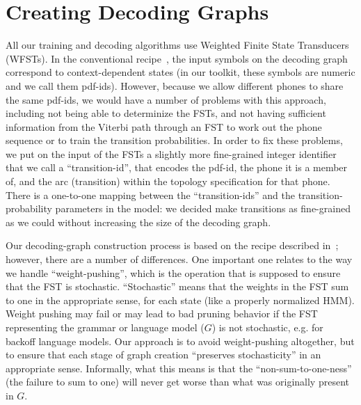 \documentclass[10pt,conference,letterpaper]{IEEEtran}
\begin{document}
\section{Creating Decoding Graphs}
\label{sec:graphs}

All our training and decoding algorithms use Weighted Finite State Transducers 
(WFSTs).  In the conventional 
recipe~\cite{wfst}, the input symbols on the decoding graph correspond to 
context-dependent states (in our toolkit, these symbols are 
numeric and we call them pdf-ids).  However, because we allow different phones 
to share the same pdf-ids, we would have a number of problems with this 
approach, including not being able to determinize the FSTs, and not having 
sufficient information from the Viterbi path through an FST to work out the 
phone sequence or to train the transition probabilities.  In order to fix these 
problems, we put on the input of the FSTs a slightly more fine-grained integer 
identifier that we call a ``transition-id'', that encodes the pdf-id, the phone 
it is a member of, and the arc (transition) within the topology specification 
for that phone.  There is a one-to-one mapping between the ``transition-ids'' 
and the transition-probability parameters in the model: we decided 
make transitions as fine-grained as we could without increasing the 
size of the decoding graph.  

Our decoding-graph construction process is based on the recipe described
in~\cite{wfst}; however, there are a number of differences.  One important one
relates to the way we handle ``weight-pushing'', which is the operation that is
supposed to ensure that the FST is stochastic.  ``Stochastic'' means that the
weights in the FST sum to one in the appropriate sense, for each state (like a
properly normalized HMM).  Weight pushing may fail or may lead to bad pruning 
behavior if the FST representing the grammar or language model ($G$) is not 
stochastic, e.g. for backoff language models.  Our approach is to
avoid weight-pushing altogether, but to ensure that each stage of graph creation
``preserves stochasticity'' in an appropriate sense.  Informally, what this 
means is that the ``non-sum-to-one-ness'' (the failure to sum to one) will 
never get worse than what was originally present in $G$. 
\end{document}

